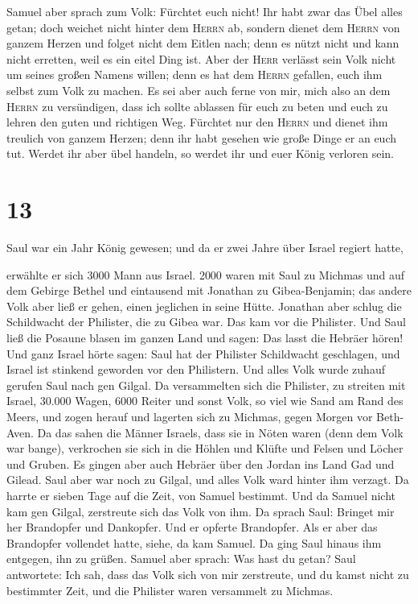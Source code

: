  Samuel aber sprach zum Volk: Fürchtet euch nicht! Ihr
habt zwar das Übel alles getan; doch weichet nicht hinter dem
\textsc{Herrn} ab, sondern dienet dem \textsc{Herrn} von ganzem Herzen
 und folget nicht dem Eitlen nach; denn es nützt nicht
und kann nicht erretten, weil es ein eitel Ding ist. 
Aber der \textsc{Herr} verlässt sein Volk nicht um seines großen Namens
willen; denn es hat dem \textsc{Herrn} gefallen, euch ihm selbst zum
Volk zu machen.  Es sei aber auch ferne von mir, mich
also an dem \textsc{Herrn} zu versündigen, dass ich sollte ablassen für
euch zu beten und euch zu lehren den guten und richtigen Weg.
 Fürchtet nur den \textsc{Herrn} und dienet ihm treulich
von ganzem Herzen; denn ihr habt gesehen wie große Dinge er an euch tut.
 Werdet ihr aber übel handeln, so werdet ihr und euer
König verloren sein.

\hypertarget{section-12}{%
\section{13}\label{section-12}}

 Saul war ein Jahr König gewesen; und da er zwei Jahre
über Israel regiert hatte,

 erwählte er sich 3000 Mann aus Israel. 2000 waren mit
Saul zu Michmas und auf dem Gebirge Bethel und eintausend mit Jonathan
zu Gibea-Benjamin; das andere Volk aber ließ er gehen, einen jeglichen
in seine Hütte.  Jonathan aber schlug die Schildwacht der
Philister, die zu Gibea war. Das kam vor die Philister. Und Saul ließ
die Posaune blasen im ganzen Land und sagen: Das lasst die Hebräer
hören!  Und ganz Israel hörte sagen: Saul hat der
Philister Schildwacht geschlagen, und Israel ist stinkend geworden vor
den Philistern. Und alles Volk wurde zuhauf gerufen Saul nach gen
Gilgal.  Da versammelten sich die Philister, zu streiten
mit Israel, 30.000 Wagen, 6000 Reiter und sonst Volk, so viel wie Sand
am Rand des Meers, und zogen herauf und lagerten sich zu Michmas, gegen
Morgen vor Beth-Aven.  Da das sahen die Männer Israels,
dass sie in Nöten waren (denn dem Volk war bange), verkrochen sie sich
in die Höhlen und Klüfte und Felsen und Löcher und Gruben.
 Es gingen aber auch Hebräer über den Jordan ins Land Gad
und Gilead. Saul aber war noch zu Gilgal, und alles Volk ward hinter ihm
verzagt.  Da harrte er sieben Tage auf die Zeit, von
Samuel bestimmt. Und da Samuel nicht kam gen Gilgal, zerstreute sich das
Volk von ihm.  Da sprach Saul: Bringet mir her Brandopfer
und Dankopfer. Und er opferte Brandopfer.  Als er aber
das Brandopfer vollendet hatte, siehe, da kam Samuel. Da ging Saul
hinaus ihm entgegen, ihn zu grüßen.  Samuel aber sprach:
Was hast du getan? Saul antwortete: Ich sah, dass das Volk sich von mir
zerstreute, und du kamst nicht zu bestimmter Zeit, und die Philister
waren versammelt zu Michmas.

